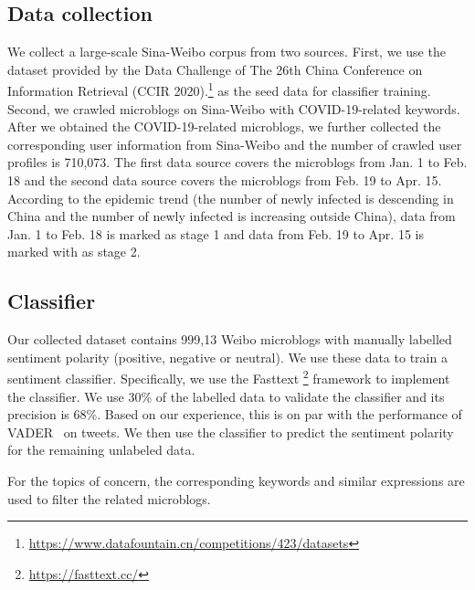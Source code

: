 \documentclass[sigconf, nonacm=true]{acmart}
\begin{document}
\subsection{Data collection}
We collect a large-scale Sina-Weibo corpus from two sources. First, we use the dataset provided by the Data Challenge of The 26th China Conference on Information Retrieval (CCIR 2020).\footnote{\url{https://www.datafountain.cn/competitions/423/datasets}} as the seed data for classifier training. Second, we crawled microblogs on Sina-Weibo with COVID-19-related keywords.
After we obtained the COVID-19-related microblogs, we further collected the corresponding user information from Sina-Weibo and the number of crawled user profiles is 710,073.
The first data source covers the microblogs from Jan. 1 to Feb. 18 and the second data source covers the microblogs from Feb. 19 to Apr. 15.
According to the epidemic trend (the number of newly infected is descending in China and the number of newly infected is increasing outside China), data from Jan. 1 to Feb. 18 is marked as stage 1 and data from Feb. 19 to Apr. 15 is marked with as stage 2.

\subsection{Classifier}
Our collected dataset contains 999,13 Weibo microblogs with manually labelled sentiment polarity (positive, negative or neutral). We use these data to train a sentiment classifier. Specifically, we use the Fasttext \footnote{\url{https://fasttext.cc/}} framework to implement the classifier. We use 30\% of the labelled data to validate the classifier and its precision is 68\%. Based on our experience, this is on par with the performance of VADER~\cite{hutto2014vader} on tweets. We then use the classifier to predict the sentiment polarity for the remaining unlabeled data.

For the topics of concern, the corresponding keywords and similar expressions are used to filter the related microblogs.
\end{document}
